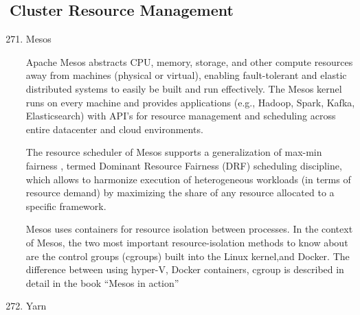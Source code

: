 \subsection{Cluster Resource Management}
\label{\detokenize{i524/technologies:cluster-resource-management}}\begin{enumerate}
\setcounter{enumi}{270}
\item {} 
Mesos

Apache Mesos \label{\detokenize{i524/technologies:id505}}{\hyperref[\detokenize{i524/technologies:www-mesos}]{\sphinxcrossref{{[}434{]}}}} abstracts CPU, memory,
storage, and other compute resources away from machines (physical
or virtual), enabling fault-tolerant and elastic distributed
systems to easily be built and run effectively. The Mesos kernel
runs on every machine and provides applications (e.g., Hadoop,
Spark, Kafka, Elasticsearch) with API’s for resource management
and scheduling across entire datacenter and cloud environments.

The resource scheduler of Mesos supports a generalization of
max-min fairness \label{\detokenize{i524/technologies:id506}}{\hyperref[\detokenize{i524/technologies:paper-mesos-abu-dbai-2016}]{\sphinxcrossref{{[}435{]}}}}, termed Dominant
Resource Fairness (DRF) \label{\detokenize{i524/technologies:id507}}{\hyperref[\detokenize{i524/technologies:paper-mesos-ghodsi2011dominant}]{\sphinxcrossref{{[}436{]}}}}
scheduling discipline, which allows to harmonize execution of
heterogeneous workloads (in terms of resource demand) by
maximizing the share of any resource allocated to a specific
framework.

Mesos uses containers for resource isolation between
processes. In the context of Mesos, the two most important
resource-isolation methods to know about are the control groups
(cgroups) built into the Linux kernel,and Docker. The difference
between using hyper-V, Docker containers, cgroup is described in
detail in the book ``Mesos in action'' \label{\detokenize{i524/technologies:id508}}{\hyperref[\detokenize{i524/technologies:book-mesos-ignazio-2016}]{\sphinxcrossref{{[}437{]}}}}

\item {} 
Yarn


\end{enumerate}
